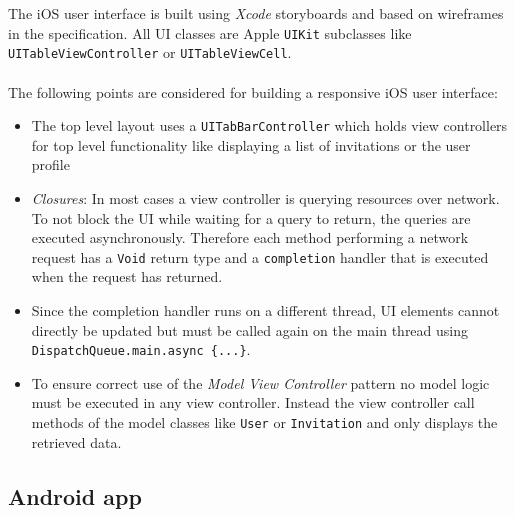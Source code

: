\documentclass[12pt]{scrartcl}
\begin{document}
The iOS user interface is built using \emph{Xcode} storyboards and based on wireframes in the specification. All UI classes are Apple \texttt{UIKit} subclasses like \texttt{UITableViewController} or \texttt{UITableViewCell}.\\
\\
The following points are considered for building a responsive iOS user interface:
\begin{itemize}
	\item The top level layout uses a \texttt{UITabBarController} which holds view controllers for top level functionality like displaying a list of invitations or the user profile
	
	\item \emph{Closures}: In most cases a view controller is querying resources over network. To not block the UI while waiting for a query to return, the queries are executed asynchronously. Therefore each method performing a network request has a \texttt{Void} return type and a \texttt{completion} handler that is executed when the request has returned.
	
	\item Since the completion handler runs on a different thread, UI elements cannot directly be updated but must be called again on the main thread using\\ \texttt{DispatchQueue.main.async \{...\}}.
	
	\item To ensure correct use of the \emph{Model View Controller} pattern no model logic must be executed in any view controller. Instead the view controller call methods of the model classes like \texttt{User} or \texttt{Invitation} and only displays the retrieved data.
\end{itemize}

\newpage
\subsection{Android app}
\end{document}

